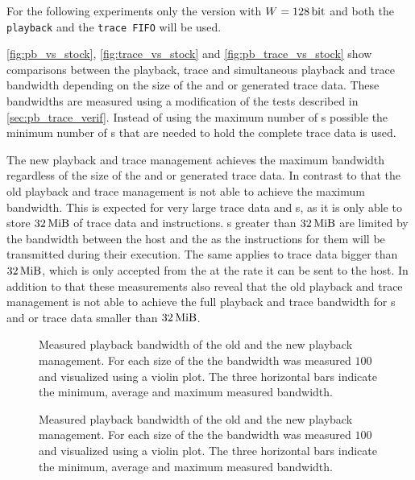 For the following experiments only the version with $W = \SI{128}{\bit}$ and both the \texttt{playback} and the \texttt{trace FIFO} will be used.

\autoref{fig:pb_vs_stock}, \autoref{fig:trace_vs_stock} and \autoref{fig:pb_trace_vs_stock} show comparisons between the playback, trace and simultaneous playback and trace bandwidth depending on the size of the \PlaybackProgram{} and or generated trace data. These bandwidths are measured using a modification of the tests described in \autoref{sec:pb_trace_verif}. Instead of using the maximum number of \descriptor{}s possible the minimum number of \descriptor{}s that are needed to hold the complete \PlaybackProgram{} trace data is used.

The new playback and trace management achieves the maximum bandwidth regardless of the size of the \PlaybackProgram{} and or generated trace data. In contrast to that the old playback and trace management is not able to achieve the maximum bandwidth. This is expected for very large trace data and \PlaybackProgram{}s, as it is only able to store $\SI{32}{\mebi\byte}$ of trace data and \PlaybackProgram{} instructions. \PlaybackProgram{}s greater than $\SI{32}{\mebi\byte}$ are limited by the bandwidth between the host and the \FPGA{} as the instructions for them will be transmitted during their execution. The same applies to trace data bigger than $\SI{32}{\mebi\byte}$, which is only accepted from the \pbexec{} at the rate it can be sent to the host.
In addition to that these measurements also reveal that the old playback and trace management is not able to achieve the full playback and trace bandwidth for \PlaybackProgram{}s and or trace data smaller than $\SI{32}{\mebi\byte}$.
\begin{figure}
\label{fig:pb_vs_stock}
\caption{Measured playback bandwidth of the old and the new playback management. For each size of the \PlaybackProgram{} the bandwidth was measured $\num{100}$ and visualized using a violin plot. The three horizontal bars indicate the minimum, average and maximum measured bandwidth.}
\end{figure}

\begin{figure}
\label{fig:trace_vs_stock}
\caption{Measured playback bandwidth of the old and the new playback management. For each size of the \PlaybackProgram{} the bandwidth was measured $\num{100}$ and visualized using a violin plot. The three horizontal bars indicate the minimum, average and maximum measured bandwidth.}
\end{figure}


